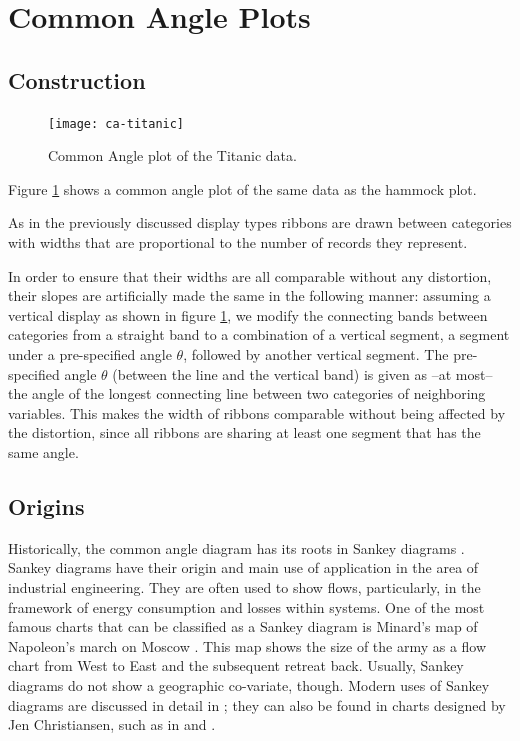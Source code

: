\section{ Common Angle Plots}
\subsection{Construction}


\begin{figure}[htbp] %
   \centering
   \texttt{[image: ca-titanic]} 
   \caption{Common Angle plot of the Titanic data. }
   \label{fig:ca-titanic}
\end{figure}

Figure \ref{fig:ca-titanic} shows a common angle plot of the same data as the hammock plot.

As in the previously discussed display types ribbons are drawn between categories with widths  that are proportional to  the number of records they represent.

In order to ensure that their widths are all comparable without any distortion, their slopes  are artificially made the same in the following manner: 
assuming a vertical display as shown in figure \ref{fig:ca-titanic}, we modify  the connecting bands between  categories from a straight band  to a combination of a vertical  segment, a  segment under a pre-specified angle $\theta$, followed by another vertical  segment.  
The pre-specified angle $\theta$ (between the line and the vertical band) is given as --at most-- the angle of the longest connecting line between two categories of neighboring variables. 
This makes the width of ribbons  comparable without being affected by the distortion, since all ribbons are sharing at least one segment that has the same angle. 

\subsection{Origins}
Historically, the common angle diagram has its roots in Sankey diagrams \citep{sankey:1898}. Sankey diagrams have their origin and main use of application in the area of industrial engineering. They are often used to show flows,  particularly, in the framework of energy consumption and losses within systems.
One of the most famous charts that can be classified as a Sankey diagram is Minard's map of Napoleon's march on Moscow \citep{minard:1812}. This map  shows the size of the army as a flow chart from West to East and the subsequent retreat back. Usually, Sankey diagrams do not show a geographic co-variate, though. Modern uses of Sankey diagrams are discussed in  detail in \citep{schmidt:2008};  they can also be found in charts designed by Jen Christiansen, such as in \cite{jen1} and \cite{jen2}.

